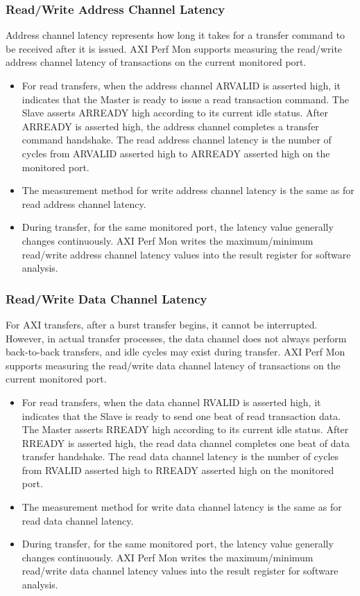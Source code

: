 \documentclass[main\_\_EN.tex]{subfiles}
\begin{document}
\subsubsection{Read/Write Address Channel Latency}
Address channel latency represents how long it takes for a transfer command to be received after it is issued. AXI Perf Mon supports measuring the read/write address channel latency of transactions on the current monitored port.
\begin{itemize}
    \item For read transfers, when the address channel ARVALID is asserted high, it indicates that the Master is ready to issue a read transaction command. The Slave asserts ARREADY high according to its current idle status. After ARREADY is asserted high, the address channel completes a transfer command handshake. The read address channel latency is the number of cycles from ARVALID asserted high to ARREADY asserted high on the monitored port.
    \item The measurement method for write address channel latency is the same as for read address channel latency.
    \item During transfer, for the same monitored port, the latency value generally changes continuously. AXI Perf Mon writes the maximum/minimum read/write address channel latency values into the result register for software analysis.
\end{itemize}

\subsubsection{Read/Write Data Channel Latency}
For AXI transfers, after a burst transfer begins, it cannot be interrupted. However, in actual transfer processes, the data channel does not always perform back-to-back transfers, and idle cycles may exist during transfer. AXI Perf Mon supports measuring the read/write data channel latency of transactions on the current monitored port.
\begin{itemize}
    \item For read transfers, when the data channel RVALID is asserted high, it indicates that the Slave is ready to send one beat of read transaction data. The Master asserts RREADY high according to its current idle status. After RREADY is asserted high, the read data channel completes one beat of data transfer handshake. The read data channel latency is the number of cycles from RVALID asserted high to RREADY asserted high on the monitored port.
    \item The measurement method for write data channel latency is the same as for read data channel latency.
    \item During transfer, for the same monitored port, the latency value generally changes continuously. AXI Perf Mon writes the maximum/minimum read/write data channel latency values into the result register for software analysis.
\end{itemize}
\end{document}
